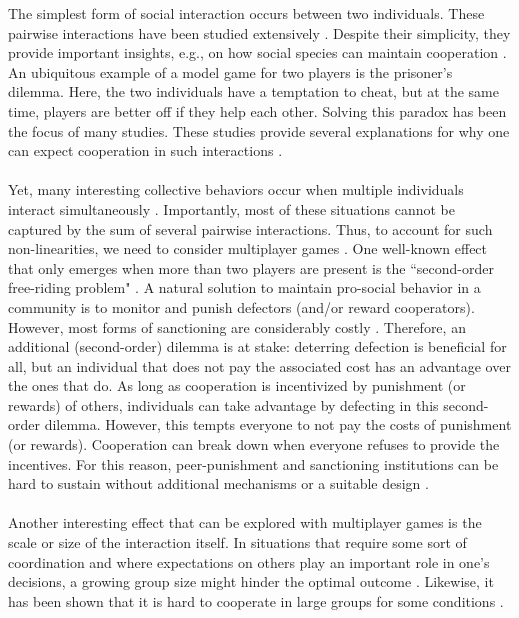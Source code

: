 \documentclass[11pt]{article}
\theoremstyle{plainCl1}
\theoremstyle{plainCl2}
\begin{document}
The simplest form of social interaction occurs between two individuals. These pairwise interactions have been studied extensively \cite{Hofbauer:book:1998}. Despite their simplicity, they provide important insights, e.g., on how social species can maintain cooperation \cite{Axelrod:book:1984, Nowak:book:2011}. An ubiquitous example of a model game for two players is the prisoner's dilemma. Here, the two individuals have a temptation to cheat, but at the same time, players are better off if they help each other. Solving this paradox has been the focus of many studies. These studies provide several explanations for why one can expect cooperation in such interactions \cite{Nowak:Science:2006}. 
\\ \\
\noindent Yet, many interesting collective behaviors occur when multiple individuals interact simultaneously \cite{Palm:JMB:1984, Skyrms:book:2003, Pacheco:PRSB:2009, Archetti:EL:2011, Archetti:JTB:2012, Gokhale:DGAA:2014, Hilbe:JTB:2015, Venkateswaran:PRSB:2019}.
Importantly, most of these situations cannot be captured by the sum of several pairwise interactions. Thus, to account for such non-linearities, we need to consider multiplayer games \cite{Gokhale:DGAA:2014}. One well-known effect that only emerges when more than two players are present is the ``second-order free-riding problem" \cite{Fowler:PNAS:2005}. A natural solution to maintain pro-social behavior in a community is to monitor and punish defectors (and/or reward cooperators). However, most forms of sanctioning are considerably costly \cite{Henrich:Science:2006}. Therefore, an additional (second-order) dilemma is at stake: deterring defection is beneficial for all, but an individual that does not pay the associated cost has an advantage over the ones that do. As long as cooperation is incentivized by punishment (or rewards) of others, individuals can take advantage by defecting in this second-order dilemma. However, this tempts everyone to not pay the costs of punishment (or rewards). Cooperation can break down when everyone refuses to provide the incentives. For this reason, peer-punishment and sanctioning institutions can be hard to sustain without additional mechanisms or a suitable design \cite{Panchanathan:Nature:2004, Perc:SciRep:2012, Hilbe:SciRep:2012, Couto:JTB:2020, Pal:NatCom:2022}.
\\ \\
\noindent 
Another interesting effect that can be explored with multiplayer games is the scale or size of the interaction itself. In situations that require some sort of coordination and where expectations on others play an important role in one's decisions, a growing group size might hinder the optimal outcome \cite{Skyrms:book:2003}. Likewise, it has been shown that it is hard to cooperate in large groups for some conditions \cite{Santos:PNAS:2011, Hilbe:JTB:2015}.
\end{document}
